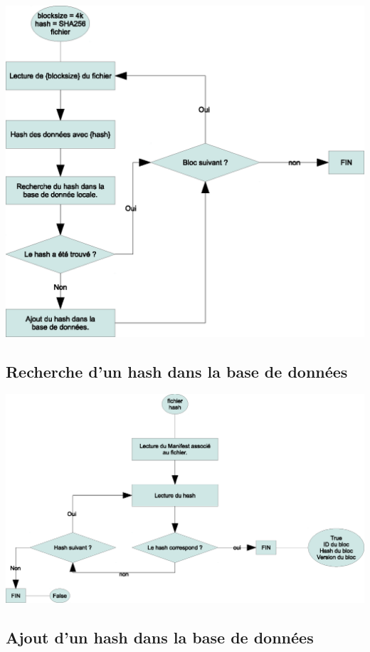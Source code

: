 \begin{center}
     \includegraphics[scale=0.5]{img/decoupage.eps}
\end{center}

\subsection{Recherche d'un hash dans la base de données}

\begin{center}
     \includegraphics[scale=0.5]{img/recherche.eps}
\end{center}

\subsection{Ajout d'un hash dans la base de données}

